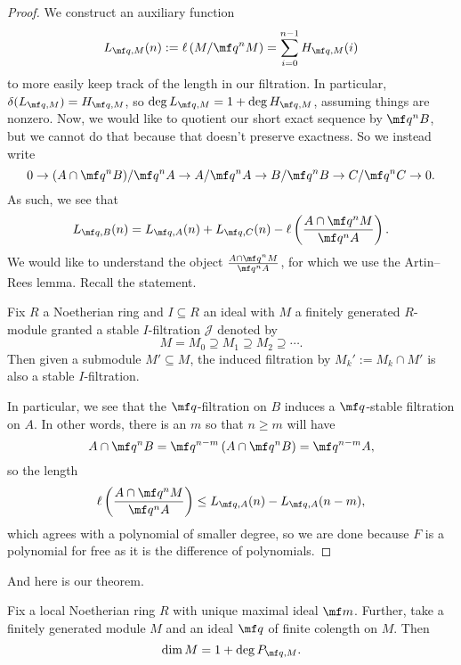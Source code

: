 \documentclass[../notes.tex]{subfiles}
\begin{document}
\begin{proof}
	We construct an auxiliary function
	\[L_{\mf q,M}(n):=\ell\left(M/\mf q^nM\right)=\sum_{i=0}^{n-1}H_{\mf q,M}(i)\]
	to more easily keep track of the length in our filtration. In particular, $\delta(L_{\mf q,M})=H_{\mf q,M}$, so $\deg L_{\mf q,M}=1+\deg H_{\mf q,M}$, assuming things are nonzero. Now, we would like to quotient our short exact sequence by $\mf q^nB$, but we cannot do that because that doesn't preserve exactness. So we instead write
	\[0\to (A\cap\mf q^nB)/\mf q^nA\to A/\mf q^nA\to B/\mf q^nB\to C/\mf q^nC\to0.\]
	As such, we see that
	\[L_{\mf q,B}(n)=L_{\mf q,A}(n)+L_{\mf q,C}(n)-\ell\left(\frac{A\cap\mf q^nM}{\mf q^nA}\right).\]
	We would like to understand the object $\frac{A\cap\mf q^nM}{\mf q^nA}$, for which we use the Artin--Rees lemma. Recall the statement.
	\begin{theorem}
		Fix $R$ a Noetherian ring and $I\subseteq R$ an ideal with $M$ a finitely generated $R$-module granted a stable $I$-filtration $\mathcal J$ denoted by
		\[M=M_0\supseteq M_1\supseteq M_2\supseteq\cdots.\]
		Then given a submodule $M'\subseteq M$, the induced filtration by $M_k':=M_k\cap M'$ is also a stable $I$-filtration.
	\end{theorem}
	In particular, we see that the $\mf q$-filtration on $B$ induces a $\mf q$-stable filtration on $A$. In other words, there is an $m$ so that $n\ge m$ will have
	\[A\cap\mf q^nB=\mf q^{n-m}\left(A\cap\mf q^nB\right)=\mf q^{n-m}A,\]
	so the length
	\[\ell\left(\frac{A\cap\mf q^nM}{\mf q^nA}\right)\le L_{\mf q,A}(n)-L_{\mf q,A}(n-m),\]
	which agrees with a polynomial of smaller degree, so we are done because $F$ is a polynomial for free as it is the difference of polynomials.
\end{proof}
And here is our theorem.
\begin{theorem}
	Fix a local Noetherian ring $R$ with unique maximal ideal $\mf m$. Further, take a finitely generated module $M$ and an ideal $\mf q$ of finite colength on $M$. Then
	\[\dim M=1+\deg P_{\mf q,M}.\]
\end{theorem}
\end{document}

